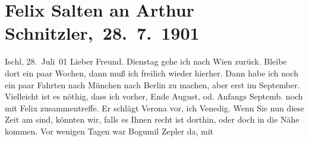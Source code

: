 

         
         \renewcommand{\erwaehntePersonen}{Personen: Friedrich von Bodenstedt, Hugo Felix, Mirzä Şäfi Vazeh, Josef Willomitzer, Bogumil Zepler}
         \renewcommand{\erwaehnteOrte}{Orte: Bad Ischl, Berlin, Jung-Wiener Theater zum Lieben Augustin, Lago di Garda, München, Vahrn, Venedig, Verona, Wien}
         \renewcommand{\erwaehnteWerke}{Werke: Der einsame Weg. Schauspiel in fünf Akten, Die Gedenktafel der Prinzessin Anna, Die Insel. Monatsschrift mit Buchschmuck und Illustrationen, Hafisa, Neue Loreley}
               \section[ Felix Salten an Arthur Schnitzler, 28. 7. 1901]{ Felix Salten an Arthur Schnitzler, 28. 7. 1901}\nopagebreak{}\rehead{ }\begin{ledgroupsized}[t]{13cm}\normalsize\beginnumbering \toendnotes[C]{\smallbreak\pagebreak[2]} 
\toendnotes[C]{\smallbreak}\pstart
           \raggedleft{}{\pb}Ischl, 28. Juli 01\pend
           \pstart
           Lieber Freund.{ }Dienstag gehe ich nach Wien zurück. Bleibe dort ein paar Wochen, dann muß ich freilich wieder
               hierher. Dann habe ich noch ein paar Fahrten nach München nach Berlin zu
               machen, aber erst im September. Vielleicht ist es nöthig,
               dass ich vorher, Ende August, od. Anfangs Septemb. noch mit Felix zusammentreffe. Er schlägt Verona vor, ich Venedig.
               Wenn Sie nun diese Zeit am \label{K_L03316-1v}\label{K_L03316-1h} sind,
               könnten wir, falls es Ihnen recht ist dorthin, oder doch in die Nähe kommen. Vor
               wenigen Tagen war Bogumil Zepler da, mit

\end{ledgroupsized}
